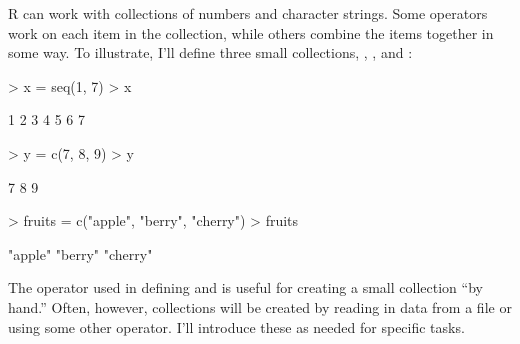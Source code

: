 R can work with collections of numbers and
character strings.  Some operators work on each item in the
collection, while others combine the items together in some way.  To
illustrate, I'll define three small collections, , ,
and :
\begin{Schunk}
\begin{Sinput}
> x = seq(1, 7)
> x
\end{Sinput}
\begin{Soutput}
[1] 1 2 3 4 5 6 7
\end{Soutput}
\begin{Sinput}
> y = c(7, 8, 9)
> y
\end{Sinput}
\begin{Soutput}
[1] 7 8 9
\end{Soutput}
\begin{Sinput}
> fruits = c("apple", "berry", "cherry")
> fruits
\end{Sinput}
\begin{Soutput}
[1] "apple"  "berry"  "cherry"
\end{Soutput}
\end{Schunk}
The  operator used in defining  and  is
useful for creating a small collection ``by hand.''  Often, however,
collections will be created by reading in data from a file or using
some other operator.  I'll introduce these as needed for specific tasks.


